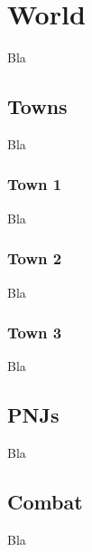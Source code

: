 \documentclass[a4paper,12pt]{book}
\begin{document}
\chapter{World}
Bla
\section{Towns}
Bla
\subsection{Town 1}
Bla
\subsection{Town 2}
Bla
\subsection{Town 3}
Bla
\section{PNJs}
Bla
\section{Combat}
Bla
\end{document}
